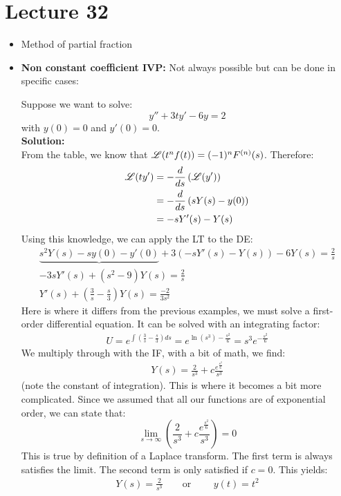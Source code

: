 
\chapter*{Lecture 32}

\begin{recall}{}{}
\begin{itemize}
\item Method of partial fraction
\end{itemize}
\end{recall}
\begin{itemize}

\item \textbf{Non constant coefficient IVP:} Not always possible but can be done in specific cases:
\begin{exmp}{}
Suppose we want to solve:
\begin{equation*}
y'' +3ty'-6y=2
\end{equation*}
with $y(0)=0$ and $y'(0)=0$. \\
\textbf{Solution:}\\
From the table, we know that $\operatorname{\mathscr{L}}(t^n f(t)) = (-1)^n F^{(n)}(s)$. Therefore:
\begin{align*}
\operatorname{\mathscr{L}}(ty')&=-\frac{d}{ds}\left(\operatorname{\mathscr{L}} (y')\right)\\
&=-\frac{d}{ds}\left(sY(s)-y(0)\right)\\
&=-sY'(s)-Y(s)
\end{align*}
Using this knowledge, we can apply the LT to the DE:
\begin{align*}
\underbrace{s^2Y(s)-sy(0)-y'(0)}+3\left(-sY'(s)-Y(s)\right)-6Y(s)=\frac{2}{s}\\
-3sY'(s) + (s^2-9)Y(s)=\frac{2}{s}\\
Y'(s) + (\frac{3}{s}-\frac{s}{3})Y(s)=\frac{-2}{3s^2}
\end{align*}
Here is where it differs from the previous examples, we must solve a first-order differential equation. It can be solved with an integrating factor:
\begin{align*}
U=e^{\int \left(\frac{3}{s}-\frac{s}{3}\right)ds}=e^{\ln(s^3)-\frac{s^2}{6}}=s^3e^{-\frac{s^2}{6}}
\end{align*}
We multiply through with the IF, with a bit of math, we find:
\begin{align*}
Y(s)=\frac{2}{s^3}+c\frac{e^{\frac{s^2}{6}}}{s^3}
\end{align*}
(note the constant of integration).  This is where it becomes a bit more complicated. Since we assumed that all our functions are of exponential order, we can state that:
\begin{equation*}
\lim_{s\rightarrow\infty}\left(\frac{2}{s^3}+c\frac{e^{\frac{s^2}{6}}}{s^3}\right)=0
\end{equation*}
This is true by definition of a Laplace transform. The first term is always satisfies the limit. The second term is only satisfied if $c=0$. This yields:
\begin{align*}
Y(s)=\frac{2}{s^3} \qquad \text{or }\qquad y(t)=t^2
\end{align*}
\end{exmp}


\end{itemize}





